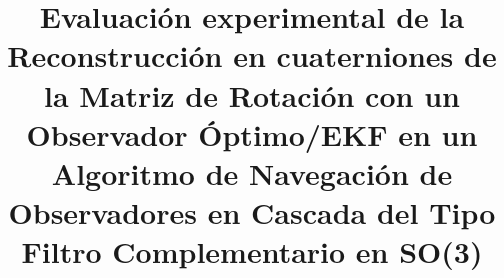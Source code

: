 \documentclass[conference]{IEEEtran}
\begin{document}
%
\title{Evaluación experimental de la Reconstrucción en cuaterniones de la Matriz de Rotación con un Observador Óptimo/EKF en un Algoritmo de Navegación de Observadores en Cascada del Tipo Filtro Complementario en SO(3)}



% 
\author{
}




\end{document}
